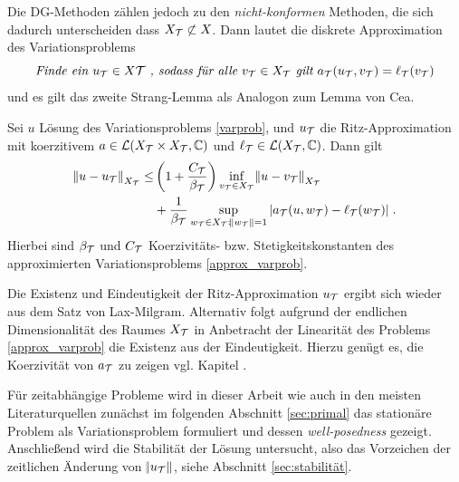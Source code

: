 Die DG-Methoden zählen jedoch zu den \emph{nicht-konformen} Methoden, die sich dadurch unterscheiden dass $X_{\mathcal{T}}\not\subset X$. Dann lautet die diskrete Approximation des Variationsproblems
\begin{equation}
  \emph{Finde ein } u_{\mathcal{T}}\in X{\mathcal{T}}\emph{ , sodass für alle } v_{\mathcal{T}}\in X_{\mathcal{T}} \emph{ gilt } a_{\mathcal{T}}(u_{\mathcal{T}}, v_{\mathcal{T}}) = \ell_{\mathcal{T}}(v_{\mathcal{T}})
  \label{approx_varprob}
\end{equation}
und es gilt das zweite Strang-Lemma als Analogon zum Lemma von Cea.
\begin{satz}\label{strang}
  Sei $u$ Lösung des Variationsproblems \ref{varprob}, und $u_{\mathcal{T}}$ die Ritz-Approximation mit koerzitivem $a \in \mathcal{L}(X_{\mathcal{T}} \times X_{\mathcal{T}}, \mathbb{C})$ und $\ell_{\mathcal{T}} \in \mathcal{L}(X_{\mathcal{T}}, \mathbb{C})$. Dann gilt
  \begin{equation}
    \begin{aligned}
    \norm{u-u_{\mathcal{T}}}_{X_{\mathcal{T}}} \leq &\left(1 +\frac{C_{\mathcal{T}}}{\beta_{\mathcal{T}}}\right) \inf_{v_{\mathcal{T}} \in X_{\mathcal{T}}}\norm{u-v_{\mathcal{T}}}_{X_{\mathcal{T}}} \\
    & +\frac{1}{\beta_{\mathcal{T}}} \sup_{w_{\mathcal{T}} \in X_{\mathcal{T}}: \norm{w_{\mathcal{T}}}=1} |a_{\mathcal{T}}(u,w_{\mathcal{T}})-\ell_{\mathcal{T}}(w_{\mathcal{T}})| \; .
  \end{aligned}
  \end{equation}
  Hierbei sind $\beta_{\mathcal{T}}$ und $C_{\mathcal{T}}$ Koerzivitäts- bzw. Stetigkeitskonstanten des approximierten Variationsproblems \ref{approx_varprob}.
\end{satz}
Die Existenz und Eindeutigkeit der Ritz-Approximation $u_{\mathcal{T}}$ ergibt sich wieder aus dem Satz von Lax-Milgram. Alternativ folgt aufgrund der endlichen Dimensionalität des Raumes $X_{\mathcal{T}}$ in Anbetracht der Linearität des Problems \ref{approx_varprob} die Existenz aus der Eindeutigkeit. Hierzu genügt es, die Koerzivität von $a_{\mathcal{T}}$ zu zeigen vgl. Kapitel .

Für zeitabhängige Probleme wird in dieser Arbeit wie auch in den meisten Literaturquellen \cite{NLS} zunächst im folgenden Abschnitt \ref{sec:primal} das stationäre Problem als Variationsproblem formuliert und dessen \emph{well-posedness} gezeigt. Anschließend wird die Stabilität der Lösung untersucht, also das Vorzeichen der zeitlichen Änderung von $\norm{u_{\mathcal{T}}}$, siehe Abschnitt \ref{sec:stabilität}.




